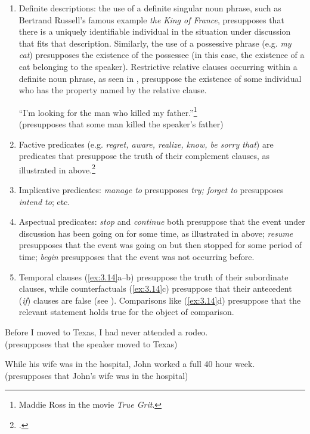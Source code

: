 \begin{enumerate}[label=\alph*.]
\item Definite descriptions: the use of a definite singular noun phrase, such as Bertrand Russell’s famous example \textit{the King of France}, presupposes that there is a uniquely identifiable individual in the situation under discussion that fits that description. Similarly, the use of a possessive phrase (e.g. \textit{my cat}) presupposes the existence of the possessee (in this case, the existence of a cat belonging to the speaker). Restrictive relative clauses occurring within a definite noun phrase, as seen in , presuppose the existence of some individual who has the property named by the relative clause.

\ea \label{ex:3.20}
“I’m looking for the man who killed my father.”\footnote{Maddie Ross in the movie \textit{True Grit}.} \\
  (presupposes that some man killed the speaker’s father)
\z

\item Factive predicates (e.g. \textit{regret, aware, realize, know, be sorry that}) are predicates that presuppose the truth of their complement clauses, as illustrated in  above.\footnote{\citet{KiparskyKiparsky1970}.}
\item Implicative predicates: \textit{manage to} presupposes \textit{try; forget to} presupposes \textit{intend to}; etc.
\item Aspectual predicates: \textit{stop} and \textit{continue} both presuppose that the event under discussion has been going on for some time, as illustrated in  above; \textit{resume} presupposes that the event was going on but then stopped for some period of time; \textit{begin} presupposes that the event was not occurring before.
\item Temporal clauses (\ref{ex:3.14}a--b) presuppose the truth of their subordinate clauses, while counterfactuals (\ref{ex:3.14}c) presuppose that their antecedent (\textit{if}) clauses are false (see ). Comparisons like (\ref{ex:3.14}d) presuppose that the relevant statement holds true for the object of comparison.
\end{enumerate}

\ea \label{ex:3.14}
\ea Before I moved to Texas, I had never attended a rodeo.\\
  (presupposes that the speaker moved to Texas)

  \ex While his wife was in the hospital, John worked a full 40 hour week.\\
  (presupposes that John’s wife was in the hospital)

